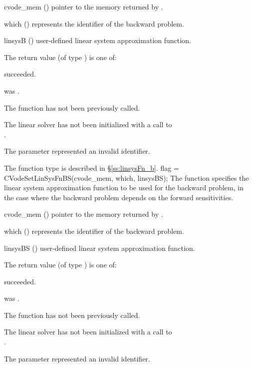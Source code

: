 {
  \begin{args}
  \item[cvode\_mem] ()
    pointer to the {\cvodes} memory returned by .
  \item[which] ()
    represents the identifier of the backward problem.
  \item[linsysB] ()
    user-defined linear system approximation function.
  \end{args}
}
{
  The return value  (of type ) is one of:
  \begin{args}
  \item[\Id{CVLS\_SUCCESS}]
     succeeded.
  \item[\Id{CVLS\_MEM\_NULL}]
     was .
  \item[\Id{CVLS\_NO\_ADJ}]
    The function  has not been previously called.
  \item[\Id{CVLS\_LMEM\_NULL}]
    The linear solver has not been initialized with a call to \\ \noindent
    .
  \item[\Id{CVLS\_ILL\_INPUT}]
    The parameter  represented an invalid identifier.
  \end{args}
}
{
  The function type  is described in \S\ref{ss:linsysFn_b}.
}
{
  flag = CVodeSetLinSysFnBS(cvode\_mem, which, linsysBS);
}
{
  The function  specifies the linear system
  approximation function to be used for the backward problem, in the
  case where the backward problem depends on the forward sensitivities.
}
{
  \begin{args}
  \item[cvode\_mem] ()
    pointer to the {\cvodes} memory returned by .
  \item[which] ()
    represents the identifier of the backward problem.
  \item[linsysBS] ()
    user-defined linear system approximation function.
  \end{args}
}
{
  The return value  (of type ) is one of:
  \begin{args}
  \item[\Id{CVLS\_SUCCESS}]
     succeeded.
  \item[\Id{CVLS\_MEM\_NULL}]
     was .
  \item[\Id{CVLS\_NO\_ADJ}]
    The function  has not been previously called.
  \item[\Id{CVLS\_LMEM\_NULL}]
    The linear solver has not been initialized with a call to \\ \noindent
    .
  \item[\Id{CVLS\_ILL\_INPUT}]
    The parameter  represented an invalid identifier.
  \end{args}
}
